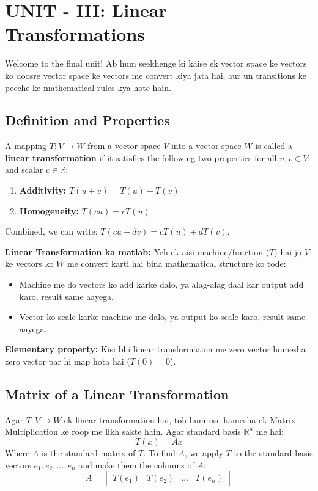 \documentclass[11pt,a4paper]{article}
\begin{document}
\newpage

\section{UNIT - III: Linear Transformations}

Welcome to the final unit! Ab hum seekhenge ki kaise ek vector space ke vectors ko doosre vector space ke vectors me convert kiya jata hai, aur un transitions ke peeche ke mathematical rules kya hote hain.

\subsection{Definition and Properties}

\begin{definitionbox}
A mapping $T: V \to W$ from a vector space $V$ into a vector space $W$ is called a \textbf{linear transformation} if it satisfies the following two properties for all $u, v \in V$ and scalar $c \in \mathbb{R}$:
\begin{enumerate}
    \item \textbf{Additivity:} $T(u + v) = T(u) + T(v)$
    \item \textbf{Homogeneity:} $T(cu) = c T(u)$
\end{enumerate}
Combined, we can write: $T(cu + dv) = cT(u) + dT(v)$.
\end{definitionbox}

\begin{hinglishbox}
\textbf{Linear Transformation ka matlab:}
Yeh ek aisi machine/function ($T$) hai jo $V$ ke vectors ko $W$ me convert karti hai bina mathematical structure ko tode:
\begin{itemize}
    \item Machine me do vectors ko add karke dalo, ya alag-alag daal kar output add karo, result same aayega.
    \item Vector ko scale karke machine me dalo, ya output ko scale karo, result same aayega.
\end{itemize}
\textbf{Elementary property:} Kisi bhi linear transformation me zero vector humesha zero vector par hi map hota hai ($T(0) = 0$).
\end{hinglishbox}

\subsection{Matrix of a Linear Transformation}
Agar $T: V \to W$ ek linear transformation hai, toh hum use hamesha ek Matrix Multiplication ke roop me likh sakte hain. Agar standard basis $\mathbb{R}^n$ me hai:
\[ T(x) = A x \]
Where $A$ is the standard matrix of $T$. 
To find $A$, we apply $T$ to the standard basis vectors $e_1, e_2, \dots, e_n$ and make them the columns of $A$:
\[ A = \begin{bmatrix} T(e_1) & T(e_2) & \dots & T(e_n) \end{bmatrix} \]
\end{document}

